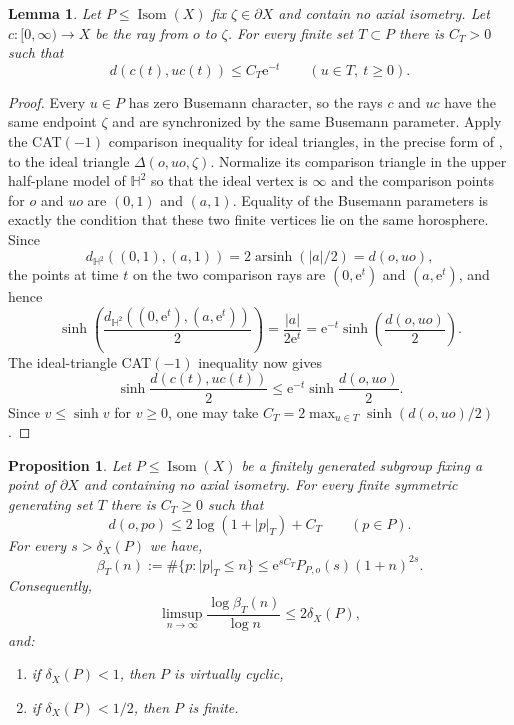 \documentclass[11pt]{article}
\newtheorem{proposition}[proposition]{Proposition}
\newtheorem{lemma}[lemma]{Lemma}
\theoremstyle{definition}
\newcommand{\Isom}{\operatorname{Isom}}
\newcommand{\e}{\mathrm e}
\begin{document}
\begin{lemma}
\label{lem:horosphere-contraction}
Let $P\le\Isom(X)$ fix $\zeta\in\partial X$ and contain no axial isometry.  Let
$c:[0,\infty)\to X$ be the ray from $o$ to $\zeta$.  For every finite set $T\subset P$ there
is $C_T>0$ such that
\begin{equation}\label{eq:horosphere-contraction}
 d(c(t),u c(t))\le C_T\e^{-t}\qquad(u\in T,\ t\ge0).
\end{equation}
\end{lemma}

\begin{proof}
Every $u\in P$ has zero Busemann character, so the rays $c$ and $uc$ have the same endpoint
$\zeta$ and are synchronized by the same Busemann parameter.  Apply the CAT$(-1)$ comparison
inequality for ideal triangles, in the precise form of
\cite[Proposition~4.4.13]{DasSimmonsUrbanski2017}, to the ideal triangle
$\Delta(o,uo,\zeta)$.  Normalize its comparison triangle in the upper half-plane model of
$\mathbb H^2$ so that the ideal vertex is $\infty$ and the comparison points for $o$ and $uo$
are $(0,1)$ and $(a,1)$.  Equality of the Busemann parameters is exactly the condition that
these two finite vertices lie on the same horosphere.  Since
\[
 d_{\mathbb H^2}((0,1),(a,1))=2\operatorname{arsinh}(|a|/2)=d(o,uo),
\]
the points at time $t$ on the two comparison rays are $(0,\e^t)$ and $(a,\e^t)$, and hence
\[
 \sinh\!\left(\frac{d_{\mathbb H^2}((0,\e^t),(a,\e^t))}{2}\right)
 =\frac{|a|}{2\e^t}
 =\e^{-t}\sinh\!\left(\frac{d(o,uo)}2\right).
\]
The ideal-triangle CAT$(-1)$ inequality now gives
\[
 \sinh\frac{d(c(t),uc(t))}{2}
 \le \e^{-t}\sinh\frac{d(o,uo)}2.
\]
Since $v\le\sinh v$ for $v\ge0$, one may take
$C_T=2\max_{u\in T}\sinh(d(o,uo)/2)$.
\end{proof}

\begin{proposition}
\label{prop:parabolic-growth}
Let $P\le\Isom(X)$ be a finitely generated subgroup fixing a point of $\partial X$ and
containing no axial isometry.  For every finite symmetric generating set $T$ there is $C_T\ge0$ such that
\begin{equation}\label{eq:parabolic-log-displacement}
 d(o,po)\le2\log(1+|p|_T)+C_T\qquad(p\in P).
\end{equation}
For every $s>\delta_X(P)$ we have,
\begin{equation}\label{eq:parabolic-polynomial-growth}
 \beta_T(n):=\#\{p:|p|_T\le n\}
 \le \e^{sC_T}P_{P,o}(s)(1+n)^{2s}.
\end{equation}
Consequently,
\begin{equation}\label{eq:parabolic-growth-degree}
 \limsup_{n\to\infty}\frac{\log\beta_T(n)}{\log n}
 \le2\delta_X(P),
\end{equation}
and:
\begin{enumerate}[label=\textup{(\roman*)}]
\item if $\delta_X(P)<1$, then $P$ is virtually cyclic,
\item if $\delta_X(P)<1/2$, then $P$ is finite.
\end{enumerate}
\end{proposition}
\end{document}
